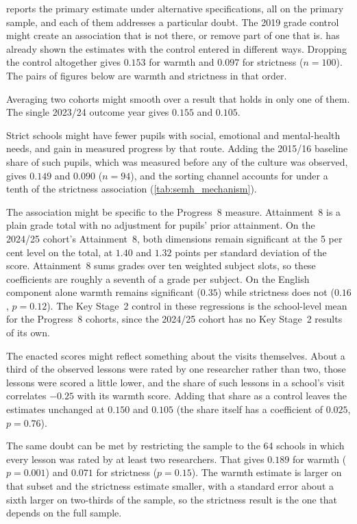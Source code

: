  reports the primary
estimate under alternative specifications, all on the primary sample, and
each of them addresses a particular doubt. The 2019 grade control might create an association that is not there, or remove part of one that is.  has already shown the estimates with the control entered in different ways. Dropping the control altogether gives $0.153$ for warmth and $0.097$ for strictness ($n = 100$). The pairs of figures below are warmth and strictness in that order.

Averaging two cohorts might smooth over a result that holds in
only one of them. The single 2023/24 outcome year gives $0.155$ and $0.105$.

Strict schools might have fewer pupils with social, emotional and
mental-health needs, and gain in measured progress by that route. Adding the
2015/16 baseline share of such pupils, which was measured before any of the
culture was observed, gives $0.149$ and $0.090$ ($n = 94$), and the sorting
channel accounts for under a tenth of the strictness association
(\cref{tab:semh_mechanism}).

The association might be specific to the Progress~8 measure. Attainment~8 is a plain grade total with no adjustment for pupils' prior attainment. On the 2024/25 cohort's Attainment~8, both dimensions remain significant at the 5 per cent level on the total, at $1.40$ and $1.32$ points per standard deviation of the score. Attainment~8 sums grades over ten weighted subject slots, so these coefficients are roughly a seventh of a grade per subject. On the English component alone warmth remains significant ($0.35$) while strictness does not ($0.16$, $p = 0.12$). The Key Stage~2 control in
these regressions is the school-level mean for the Progress~8 cohorts,
since the 2024/25 cohort has no Key Stage~2 results of its own.

The enacted scores might reflect something about the visits themselves. About
a third of the observed lessons were rated by one researcher rather than
two, those lessons were scored a little lower, and the share of such lessons
in a school's visit correlates $-0.25$ with its warmth score. Adding that
share as a control leaves the estimates unchanged at $0.150$ and $0.105$ (the share itself
has a coefficient of $0.025$, $p = 0.76$).

The same doubt can be met by restricting the sample to the 64 schools in
which every lesson was rated by at least two researchers. That gives
$0.189$ for warmth ($p = 0.001$) and $0.071$ for strictness ($p = 0.15$).
The warmth estimate is larger on that subset and the strictness estimate
smaller, with a standard error about a sixth larger on two-thirds of the
sample, so the strictness result is the one that depends on the full
sample.

